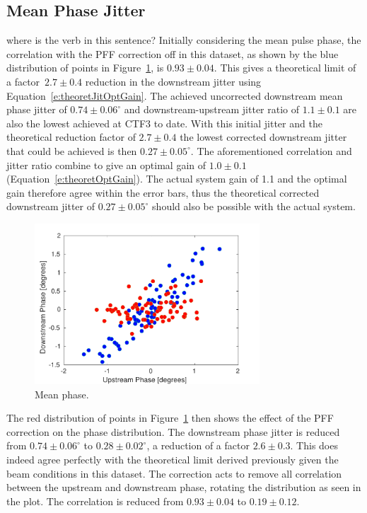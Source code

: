\subsection{Mean Phase Jitter}
\label{ss:bestMeanJitter}

{\color{red} where is the verb in this sentence?}
Initially considering the mean pulse phase, the correlation with the PFF correction off 
in this dataset, as shown by the blue distribution of points in Figure~\ref{f:BestFF_Real}, 
is \(0.93\pm0.04\). This gives a theoretical limit of a factor~\(2.7\pm0.4\) reduction in 
the downstream jitter using Equation~\ref{e:theoretJitOptGain}. 
The achieved uncorrected downstream mean phase jitter of 
\(0.74\pm0.06^\circ\) and downstream-upstream jitter ratio of \(1.1\pm0.1\) are also 
the lowest achieved at CTF3 to date. With this initial jitter and the theoretical reduction 
factor of \(2.7\pm0.4\) the lowest corrected downstream jitter that could be achieved is then \(0.27\pm0.05^\circ\).
The aforementioned correlation and jitter ratio combine to 
give an optimal gain of \(1.0\pm0.1\) (Equation~\ref{e:theoretOptGain}). The actual 
system gain of 1.1 and the optimal gain therefore agree within the error bars, thus the 
theoretical corrected downstream jitter of \(0.27\pm0.05^\circ\) should also be possible with the actual system.


\begin{figure}
  \centering
  \includegraphics[width=0.75\textwidth]{Figures/feedforward/BestFF_Real}
  \caption{Mean phase.}
  \label{f:BestFF_Real}
\end{figure}

The red distribution of points in Figure~\ref{f:BestFF_Real} then shows the effect of 
the PFF correction on the phase distribution. The downstream phase jitter is reduced 
from \(0.74\pm0.06^\circ\) to \(0.28\pm0.02^\circ\), a reduction of a factor 
\(2.6\pm0.3\).  This does indeed agree perfectly with the theoretical 
limit derived previously given the beam conditions in this dataset. The 
correction acts to remove all correlation between the upstream and downstream phase, 
rotating the distribution as seen in the plot. The correlation is reduced from 
\(0.93\pm0.04\) to \(0.19\pm0.12\). 


